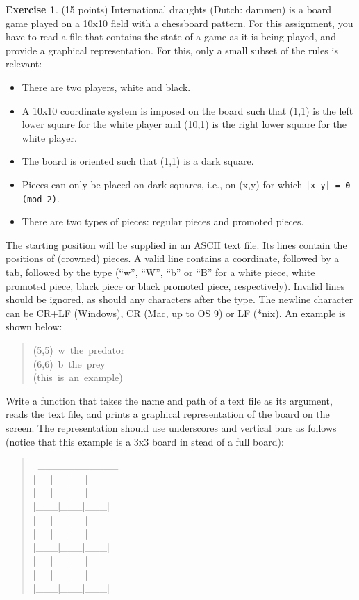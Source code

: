 \documentclass[a4paper]{report}
\theoremstyle{definition}
\newtheorem{exercise}{Exercise}
\begin{document}
\begin{exercise}
	(15 points) International draughts (Dutch: dammen) is a board game played on a 10x10 field with a chessboard pattern. For this assignment, you have to	read a file that contains the state of a game as it is being played, and provide a graphical representation. For this, only a small subset of the rules is relevant:
	\begin{itemize}
		\setlength\itemsep{1mm}
		\item There are two players, white and black.
		\item A 10x10 coordinate system is imposed on the board such that (1,1)	is the left lower square for the white player and (10,1) is the	right lower square for the white player.
		\item The board is oriented such that (1,1) is a dark square.
		\item Pieces can only be placed on dark squares, i.e., on (x,y) for which \texttt{|x-y| = 0 (mod 2)}.
		\item There are two types of pieces: regular pieces and promoted pieces.
	\end{itemize}
	
	\noindent The starting position will be supplied in an ASCII text file.  Its lines contain the positions of (crowned) pieces. A valid line contains a coordinate, followed by a tab, followed by the type (“w”, “W”, “b” or “B” for a white piece, white promoted piece, black piece or black promoted piece, respectively). Invalid lines should be ignored, as should any characters after the type. The newline character can be 	CR+LF (Windows), CR (Mac, up to OS 9) or LF (\textquotedbl{}*\textquotedbl{}nix). An example is	shown below:
	\begin{quote}{\ttfamily \raggedright \noindent
			(5,5)~w~the~predator\\
			(6,6)~b~the~prey\\
			(this~is~an~example)
		}
	\end{quote}
	Write a function that takes the name and path of a text file as	its argument, reads the text file, and prints a graphical representation of the board on the screen. The representation should use underscores and vertical bars as follows (notice that this example is a 3x3 board in stead of a full board):
	\begin{quote}{\ttfamily \raggedright \noindent
			~\_\_\_\_\_\_\_\_\_\_\_\\
			|~~~|~~~|~~~|\\
			|~~~|~~~|~~~|\\
			|\_\_\_|\_\_\_|\_\_\_|\\
			|~~~|~~~|~~~|\\
			|~~~|~~~|~~~|\\
			|\_\_\_|\_\_\_|\_\_\_|\\
			|~~~|~~~|~~~|\\
			|~~~|~~~|~~~|\\
			|\_\_\_|\_\_\_|\_\_\_|
		}
	\end{quote}
	

\end{exercise}
\end{document}
